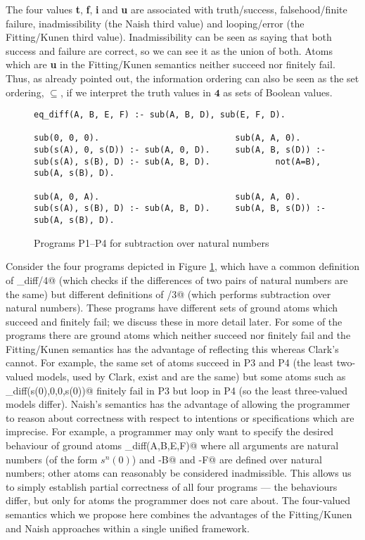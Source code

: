\documentclass{tlp}
\newcommand{\Quad}{\ensuremath{\mathbf{4}}}
\begin{document}
The four values \textbf{t}, \textbf{f}, \textbf{i} and \textbf{u} are
associated with truth/success, falsehood/finite failure, inadmissibility
(the Naish third value) and looping/error (the Fitting/Kunen third value).
Inadmissibility can be seen as saying that both success and failure are
correct, so we can see it as the union of both.  Atoms which are
\textbf{u} in the Fitting/Kunen semantics neither succeed nor finitely fail.  
Thus, as already pointed out,
the information ordering can also be seen as the
set ordering, $\subseteq$, if we interpret the truth values in $\Quad$
as sets of Boolean values.  

\begin{figure}
\begin{verbatim}
eq_diff(A, B, E, F) :- sub(A, B, D), sub(E, F, D).

sub(0, 0, 0).                           sub(A, A, 0).
sub(s(A), 0, s(D)) :- sub(A, 0, D).     sub(A, B, s(D)) :-
sub(s(A), s(B), D) :- sub(A, B, D).             not(A=B), sub(A, s(B), D).

sub(A, 0, A).                           sub(A, A, 0).
sub(s(A), s(B), D) :- sub(A, B, D).     sub(A, B, s(D)) :- sub(A, s(B), D).
\end{verbatim}
\caption{Programs P1--P4 for subtraction over natural numbers}
\label{fig-sub}
\end{figure}

Consider the four programs depicted in Figure \ref{fig-sub}, which have
a common definition of \verb@eq_diff/4@ (which checks if the differences
of two pairs of natural numbers are the same) but different definitions
of \verb@sub/3@ (which performs subtraction over
natural numbers).  These programs have different sets of ground atoms which
succeed and finitely fail; we discuss these in more detail
later.  For some of the programs there are ground atoms
which neither succeed nor finitely fail and the Fitting/Kunen semantics
has the advantage of reflecting this whereas Clark's
cannot.  For example, the same set of atoms succeed in P3 and P4
(the least two-valued models, used by Clark, exist and are the same) but
some atoms such as \verb@eq_diff(s(0),0,0,s(0))@ finitely fail in P3
but loop in P4 (so the least three-valued models differ).  Naish's
semantics has the advantage of allowing the programmer to reason about
correctness with respect to intentions or specifications which are
imprecise.  For example, a programmer may only want to specify the
desired behaviour of ground atoms \verb@eq_diff(A,B,E,F)@ where all
arguments are natural numbers (of the form $s^n(0)$) and \verb@A-B@ and
\verb@E-F@ are defined over natural numbers; other atoms can reasonably
be considered inadmissible. This allows us to simply establish partial
correctness of all four programs --- the behaviours differ, but only
for atoms the programmer does not care about.  The four-valued semantics
which we propose here combines the advantages of the Fitting/Kunen and
Naish approaches within a single unified framework.
\end{document}
